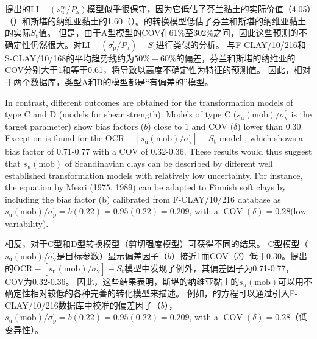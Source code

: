 \begin{ParaColumn}
    \switchcolumn

    \citet{Locat1988799}提出的$\mathrm{LI}-\left(s_{\mathrm{u}}^{\mathrm{re}}/P_{\mathrm{a}}\right)$模型似乎很保守，因为它低估了芬兰黏土的实际价值（4.05）（）和斯堪的纳维亚黏土的1.60（）。\citet{Bjerrum195449}的转换模型低估了芬兰和斯堪的纳维亚黏土的实际$ S_{\mathrm{t}}$值。 但是，由于A型模型的COV在61$\%$至302$\%$之间，因此这些预测的不确定性仍然很大。\citet{Ching2012522}对$\mathrm{LI}-\left(\sigma_{\mathrm{p}}^{\prime}/P_{\mathrm{a}}\right)-S_{\mathrm{t}}$进行类似的分析。 与F-CLAY/10/216和S-CLAY/10/168的平均趋势线约为$50\%-60\%$的偏差，芬兰和斯堪的纳维亚的COV分别大于1和等于0.61，将导致以高度不确定性为特征的预测值。 因此，相对于两个数据库，类型A和B的模型都是“有偏差的”模型。

    \switchcolumn*

    In contrast, different outcomes are obtained for the transformation models of type C and D (models for shear strength). Models of type C ($s_{\mathrm{u}}(\mathrm{mob}) / \sigma_{\mathrm{v}}^{\prime}$ is the target parameter) show bias factors ($b$) close to 1 and COV ($\delta$) lower than 0.30. Exception is found for the $\mathrm{OCR}-\left[s_{\mathrm{u}}(\mathrm{mob}) / \sigma_{\mathrm{v}}^{\prime}\right]-S_{\mathrm{t}}$ model \citet{Ching2012522}, which shows a bias factor of 0.71-0.77 with a COV of 0.32-0.36. These results would thus suggest that $s_{\mathrm{u}}(\mathrm{mob})$ of Scandinavian clays can be described by different well established transformation models with relatively low uncertainty. For instance, the equation by Mesri (1975, 1989) can be adapted to Finnish soft clays by including the bias factor (b) calibrated from F-CLAY/10/216 database as $s_{\mathrm{u}}(\mathrm{mob})/\sigma_{\mathrm{p}}^{\prime}=b(0.22)=0.95(0.22)=0.209$, with a $\operatorname{COV}(\delta)=0.28(\mathrm{low}$ variability). 

    \switchcolumn

    相反，对于C型和D型转换模型（剪切强度模型）可获得不同的结果。 C型模型（$s_{\mathrm{u}}(\mathrm{mob}) / \sigma_{\mathrm{v}}^{\prime}$是目标参数）显示偏差因子（$b$）接近1而COV（$\delta$）低于0.30。\citet{Ching2012522}提出的$\mathrm{OCR}-\left[s_{\mathrm{u}}(\mathrm{mob}) / \sigma_{\mathrm{v}}^{\prime}\right]-S_{\mathrm{t}}$模型中发现了例外，其偏差因子为0.71-0.77，COV为0.32-0.36。 因此，这些结果表明，斯堪的纳维亚黏土的$s_{\mathrm{u}}(\mathrm{mob})$可以用不确定性相对较低的各种完善的转化模型来描述。 例如，\citet{Mesri1975409,Mesri1989162}的方程可以通过引入F-CLAY/10/216数据库中校准的偏差因子（$b$），$s_{\mathrm{u}}(\mathrm{mob})/\sigma_{\mathrm{p}}^{\prime}=b(0.22)=0.95(0.22)=0.209$, with a $\operatorname{COV}(\delta)=0.28$（低变异性）。
    

\end{ParaColumn}
